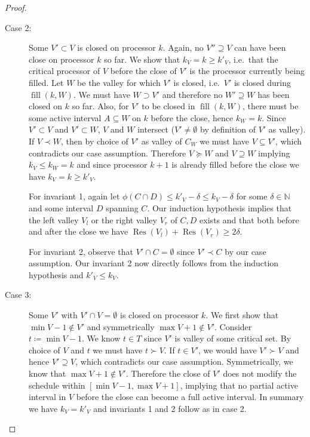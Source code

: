 \documentclass[a4paper]{article}
\DeclareMathOperator{\fillop}{fill}
\DeclareMathOperator{\res}{Res}
\begin{document}
\begin{proof}
\begin{description}
    \item[Case 2:]
      Some $V' \subset V$ is closed on processor $k$.
      Again, no $V'' \supseteq V$ can have been close on processor $k$ so far.
      We show that $k_V = k \geq k'_V$, i.e.\ that the critical processor of $V$ before the close of $V'$ is the processor currently being filled.
      Let $W$ be the valley for which $V'$ is closed, i.e.\ $V'$ is closed during $\fillop(k, W)$.
      We must have $W \supset V'$ and therefore no $W' \supseteq W$ has been closed on $k$ so far.
      Also, for $V'$ to be closed in $\fillop(k, W)$, there must be some active interval $A \subseteq W$ on $k$ before the close, hence $k_W = k$.
      Since $V' \subset V$ and $V' \subset W$, $V$ and $W$ intersect ($V' \neq \emptyset$ by definition of $V'$ as valley).
      If $V \prec W$, then by choice of $V'$ as valley of $C_W$
      we must have $V \subseteq V'$, which contradicts our case assumption.
      Therefore $V \succeq W$ and $V \supseteq W$ implying $k_V \leq k_W = k$ and since processor $k+1$ is already filled before the close we have $k_V = k \geq k'_V$.

      For invariant 1, again let $\phi(C \cap D) \leq k'_V - \delta \leq k_V - \delta$ for some $\delta \in \mathbb{N}$ and some interval $D$ spanning $C$.
      Our induction hypothesis implies that the left valley $V_l$ or the right valley $V_r$ of $C, D$ exists and that both before and after the close we have $\res(V_l) + \res(V_r) \geq 2 \delta$.

      For invariant 2, observe that $V' \cap C = \emptyset$ since $V' \prec C$ by our case assumption.
      Our invariant 2 now directly follows from the induction hypothesis and $k'_V \leq k_V$.

    \item[Case 3:]
      Some $V'$ with $V' \cap V = \emptyset$ is closed on processor $k$.
      We first show that $\min V - 1 \notin V'$ and symmetrically $\max V + 1 \notin V'$.
      Consider $t \coloneqq \min V - 1$.
      We know $t \in T$ since $V'$ is valley of some critical set.
      By choice of $V$ and $t$ we must have $t \succ V$.
      If $t \in V'$, we would have $V' \succ V$ and hence $V' \supseteq V$, which contradicts our case assumption.
      Symmetrically, we know that $\max V + 1 \notin V'$.
      Therefore the close of $V'$ does not modify the schedule within $[\min V - 1, \max V + 1]$, implying that no partial active interval in $V$ before the close can become a full active interval.
      In summary we have $k_V = k'_V$ and invariants 1 and 2 follow as in case 2.


\end{description}
\end{proof}
\end{document}
